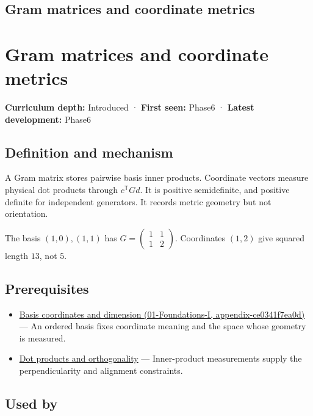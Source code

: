 \hypertarget{appendix-3b863809f82a}{}
\section*{Gram matrices and coordinate metrics}
\chapter{Gram matrices and coordinate metrics}\label{appendix-3b863809f82a-gram-matrices-and-coordinate-metrics}

\textbf{Curriculum depth:} Introduced · \textbf{First seen:} Phase6 · \textbf{Latest development:} Phase6

\section{Definition and mechanism}\label{appendix-3b863809f82a-definition-and-mechanism}

A Gram matrix stores pairwise basis inner products. Coordinate vectors measure physical dot products through \(c^\mathsf TGd\). It is positive semidefinite, and positive definite for independent generators. It records metric geometry but not orientation.

The basis \((1,0),(1,1)\) has \(G=\begin{pmatrix}1&1\\1&2\end{pmatrix}\). Coordinates \((1,2)\) give squared length \(13\), not \(5\).

\section{Prerequisites}\label{appendix-3b863809f82a-prerequisites}

\begin{itemize}
\tightlist
\item
  \href{../01-Foundations-I/main.pdf\#nameddest=appendix-ce0341f7ea0d}{Basis coordinates and dimension (01-Foundations-I, appendix-ce0341f7ea0d)} --- An ordered basis fixes coordinate meaning and the space whose geometry is measured.
\item
  \hyperref[appendix-8bc4e8fc547c]{Dot products and orthogonality} --- Inner-product measurements supply the perpendicularity and alignment constraints.
\end{itemize}

\section{Used by}\label{appendix-3b863809f82a-used-by}

